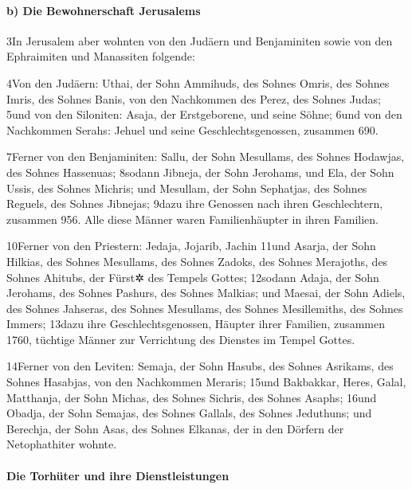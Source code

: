 \hypertarget{b-die-bewohnerschaft-jerusalems}{%
\paragraph{b) Die Bewohnerschaft
Jerusalems}\label{b-die-bewohnerschaft-jerusalems}}

3In Jerusalem aber wohnten von den Judäern und Benjaminiten sowie von
den Ephraimiten und Manassiten folgende:

4Von den Judäern: Uthai, der Sohn Ammihuds, des Sohnes Omris, des Sohnes
Imris, des Sohnes Banis, von den Nachkommen des Perez, des Sohnes Judas;
5und von den Siloniten: Asaja, der Erstgeborene, und seine Söhne; 6und
von den Nachkommen Serahs: Jehuel und seine Geschlechtsgenossen,
zusammen 690.

7Ferner von den Benjaminiten: Sallu, der Sohn Mesullams, des Sohnes
Hodawjas, des Sohnes Hassenuas; 8sodann Jibneja, der Sohn Jerohams, und
Ela, der Sohn Ussis, des Sohnes Michris; und Mesullam, der Sohn
Sephatjas, des Sohnes Reguels, des Sohnes Jibnejas; 9dazu ihre Genossen
nach ihren Geschlechtern, zusammen 956. Alle diese Männer waren
Familienhäupter in ihren Familien.

10Ferner von den Priestern: Jedaja, Jojarib, Jachin 11und Asarja, der
Sohn Hilkias, des Sohnes Mesullams, des Sohnes Zadoks, des Sohnes
Merajoths, des Sohnes Ahitubs, der Fürst✲ des Tempels Gottes; 12sodann
Adaja, der Sohn Jerohams, des Sohnes Pashurs, des Sohnes Malkias; und
Maesai, der Sohn Adiels, des Sohnes Jahseras, des Sohnes Mesullams, des
Sohnes Mesillemiths, des Sohnes Immers; 13dazu ihre Geschlechtsgenossen,
Häupter ihrer Familien, zusammen 1760, tüchtige Männer zur Verrichtung
des Dienstes im Tempel Gottes.

14Ferner von den Leviten: Semaja, der Sohn Hasubs, des Sohnes Asrikams,
des Sohnes Hasabjas, von den Nachkommen Meraris; 15und Bakbakkar, Heres,
Galal, Matthanja, der Sohn Michas, des Sohnes Sichris, des Sohnes
Asaphs; 16und Obadja, der Sohn Semajas, des Sohnes Gallals, des Sohnes
Jeduthuns; und Berechja, der Sohn Asas, des Sohnes Elkanas, der in den
Dörfern der Netophathiter wohnte.

\hypertarget{die-torhuxfcter-und-ihre-dienstleistungen}{%
\paragraph{Die Torhüter und ihre
Dienstleistungen}\label{die-torhuxfcter-und-ihre-dienstleistungen}}

